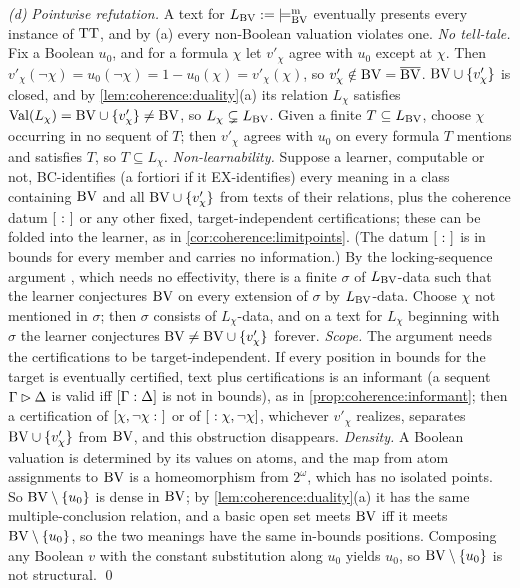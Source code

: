 \emph{(d)} \emph{Pointwise refutation.} A text for $L_{\mathrm{BV}}:={\models^{\mathrm m}_{\mathrm{BV}}}$ eventually presents every instance of $\mathrm{TT}$, and by (a) every non-Boolean valuation violates one. \emph{No tell-tale.} Fix a Boolean $u_0$, and for a formula $\chi$ let $v'_\chi$ agree with $u_0$ except at $\chi$. Then $v'_\chi(\neg\chi)=u_0(\neg\chi)=1-u_0(\chi)=v'_\chi(\chi)$, so $v'_\chi\notin\mathrm{BV}=\overline{\mathrm{BV}}$. $\mathrm{BV}\cup\{v'_\chi\}$ is closed, and by \cref{lem:coherence:duality}(a) its relation $L_\chi$ satisfies $\mathrm{Val}(L_\chi)=\mathrm{BV}\cup\{v'_\chi\}\neq\mathrm{BV}$, so $L_\chi\subsetneq L_{\mathrm{BV}}$. Given a finite $T\subseteq L_{\mathrm{BV}}$, choose $\chi$ occurring in no sequent of $T$; then $v'_\chi$ agrees with $u_0$ on every formula $T$ mentions and satisfies $T$, so $T\subseteq L_\chi$. \emph{Non-learnability.} Suppose a learner, computable or not, BC-identifies (a fortiori if it EX-identifies) every meaning in a class containing $\mathrm{BV}$ and all $\mathrm{BV}\cup\{v'_\chi\}$ from texts of their relations, plus the coherence datum $\pos{\ }{\ }$ or any other fixed, target-independent certifications; these can be folded into the learner, as in \cref{cor:coherence:limitpoints}. (The datum $\pos{\ }{\ }$ is in bounds for every member and carries no information.) By the locking-sequence argument \citep{blum1975toward,angluin1980inductive}, which needs no effectivity, there is a finite $\sigma$ of $L_{\mathrm{BV}}$-data such that the learner conjectures $\mathrm{BV}$ on every extension of $\sigma$ by $L_{\mathrm{BV}}$-data. Choose $\chi$ not mentioned in $\sigma$; then $\sigma$ consists of $L_\chi$-data, and on a text for $L_\chi$ beginning with $\sigma$ the learner conjectures $\mathrm{BV}\neq\mathrm{BV}\cup\{v'_\chi\}$ forever. \emph{Scope.} The argument needs the certifications to be target-independent. If every position in bounds for the target is eventually certified, text plus certifications is an informant (a sequent $\Gamma\rhd\Delta$ is valid iff $[\Gamma : \Delta]$ is not in bounds), as in \cref{prop:coherence:informant}; then a certification of $\pos{\chi,\neg\chi}{\ }$ or of $\pos{\ }{\chi,\neg\chi}$, whichever $v'_\chi$ realizes, separates $\mathrm{BV}\cup\{v'_\chi\}$ from $\mathrm{BV}$, and this obstruction disappears. \emph{Density.} A Boolean valuation is determined by its values on atoms, and the map from atom assignments to $\mathrm{BV}$ is a homeomorphism from $2^\omega$, which has no isolated points. So $\mathrm{BV}\setminus\{u_0\}$ is dense in $\mathrm{BV}$; by \cref{lem:coherence:duality}(a) it has the same multiple-conclusion relation, and a basic open set meets $\mathrm{BV}$ iff it meets $\mathrm{BV}\setminus\{u_0\}$, so the two meanings have the same in-bounds positions. Composing any Boolean $v$ with the constant substitution along $u_0$ yields $u_0$, so $\mathrm{BV}\setminus\{u_0\}$ is not structural. \qed

